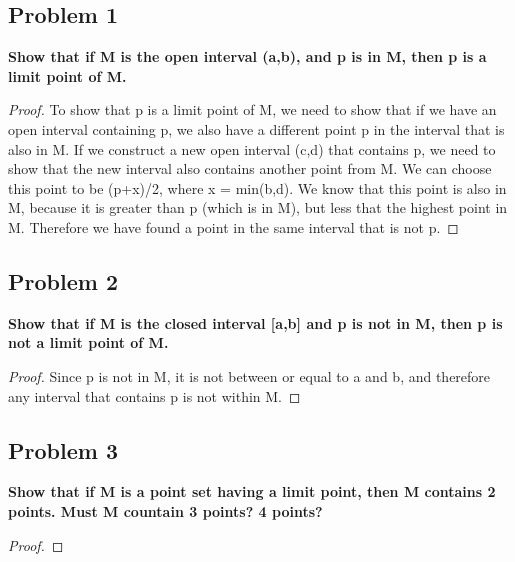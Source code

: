 \documentclass[12pt]{article}
\begin{document}
\subsection*{Problem 1}
\textbf{Show that if M is the open interval (a,b), and p is in M, then p is a limit point of M.}
\begin{proof}
To show that p is a limit point of M, we need to show that if we have an open interval containing p, we also have a different point p in the interval that is also in M. If we construct a new open interval (c,d) that contains p, we need to show that the new interval also contains another point from M. We can choose this point to be (p+x)/2, where x = min(b,d). We know that this point is also in M, because it is greater than p (which is in M), but less that the highest point in M. Therefore we have found a point in the same interval that is not p.
\end{proof}

\subsection*{Problem 2}
\textbf{Show that if M is the closed interval [a,b] and p is not in M, then p is not a limit point of M.}
\begin{proof}
Since p is not in M, it is not between or equal to a and b, and therefore any interval that contains p is not within M.
\end{proof}

\subsection*{Problem 3}
\textbf{Show that if M is a point set having a limit point, then M contains 2 points. Must M countain 3 points? 4 points?}
\begin{proof}

\end{proof}
\end{document}

